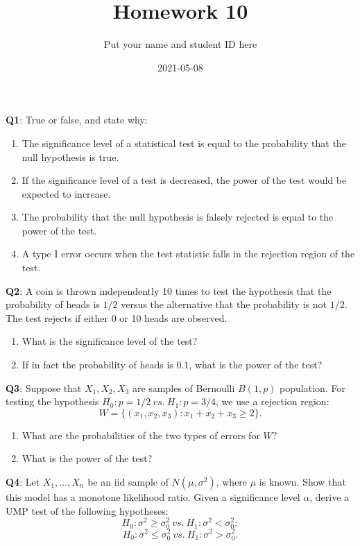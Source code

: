\documentclass[]{article}
\title{Homework 10}
\author{Put your name and student ID here}
\date{2021-05-08}
\providecommand{\tightlist}{%
  \setlength{\itemsep}{0pt}\setlength{\parskip}{0pt}}
\begin{document}
\maketitle

\textbf{Q1}: True or false, and state why:

\begin{enumerate}
\def\labelenumi{\arabic{enumi}.}
\tightlist
\item
  The significance level of a statistical test is equal to the
  probability that the null hypothesis is true.
\item
  If the significance level of a test is decreased, the power of the
  test would be expected to increase.
\item
  The probability that the null hypothesis is falsely rejected is equal
  to the power of the test.
\item
  A type I error occurs when the test statistic falls in the rejection
  region of the test.
\end{enumerate}

\textbf{Q2}: A coin is thrown independently 10 times to test the
hypothesis that the probability of heads is \(1/2\) versus the
alternative that the probability is not \(1/2\). The test rejects if
either 0 or 10 heads are observed.

\begin{enumerate}
\def\labelenumi{\arabic{enumi}.}
\tightlist
\item
  What is the significance level of the test?
\item
  If in fact the probability of heads is \(0.1\), what is the power of
  the test?
\end{enumerate}

\textbf{Q3}: Suppose that \(X_1,X_2,X_3\) are samples of Bernoulli
\(B(1,p)\) population. For testing the hypothesis
\(H_0:p=1/2\ vs.\ H_1:p=3/4\), we use a rejection region:
\[W=\{(x_1,x_2,x_3):x_1+x_2+x_3\ge 2\}.\]

\begin{enumerate}
\def\labelenumi{\arabic{enumi}.}
\tightlist
\item
  What are the probabilities of the two types of errors for \(W\)?
\item
  What is the power of the test?
\end{enumerate}

\textbf{Q4}: Let \(X_1,\dots,X_n\) be an iid sample of
\(N(\mu,\sigma^2)\), where \(\mu\) is known. Show that this model has a
monotone likelihood ratio. Given a significance level \(\alpha\), derive
a UMP test of the following hypotheses:
\[H_0:\sigma^2 \ge \sigma_0^2\ vs.\ H_1:\sigma^2<\sigma_0^2;\]
\[H_0:\sigma^2 \le \sigma_0^2\ vs.\ H_1:\sigma^2>\sigma_0^2.\]
\end{document}
